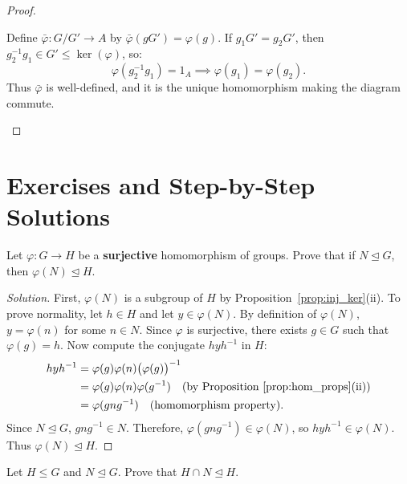 \begin{proof}
\begin{enumerate}[label=\textbf{(\roman*)}, leftmargin=*, itemsep=8pt]
    Define $\bar{\varphi}: G/G' \to A$ by $\bar{\varphi}(gG') = \varphi(g)$.
    If $g_1 G' = g_2 G'$, then $g_2^{-1}g_1 \in G' \le \ker(\varphi)$, so:
    \begin{equation*}
    \varphi(g_2^{-1}g_1) = 1_A \implies \varphi(g_1) = \varphi(g_2).
    \end{equation*}
    Thus $\bar{\varphi}$ is well-defined, and it is the unique homomorphism making the diagram commute.
\end{enumerate}
\end{proof}

\section{Exercises and Step-by-Step Solutions}
\label{sec:unit2_exercises}

\begin{problem}
Let $\varphi: G \to H$ be a \textbf{surjective} homomorphism of groups. Prove that if $N \trianglelefteq G$, then $\varphi(N) \trianglelefteq H$.
\end{problem}

\begin{proof}[Solution]
First, $\varphi(N)$ is a subgroup of $H$ by Proposition~\ref{prop:inj_ker}(ii).
To prove normality, let $h \in H$ and let $y \in \varphi(N)$.
By definition of $\varphi(N)$, $y = \varphi(n)$ for some $n \in N$.
Since $\varphi$ is surjective, there exists $g \in G$ such that $\varphi(g) = h$.
Now compute the conjugate $h y h^{-1}$ in $H$:
\begin{align*}
h y h^{-1} &= \varphi(g)\varphi(n)\bigl(\varphi(g)\bigr)^{-1} \\
&= \varphi(g)\varphi(n)\varphi(g^{-1}) \quad \text{(by Proposition~\ref{prop:hom_props}(ii))} \\
&= \varphi(gng^{-1}) \quad \text{(homomorphism property)}.
\end{align*}
Since $N \trianglelefteq G$, $gng^{-1} \in N$.
Therefore, $\varphi(gng^{-1}) \in \varphi(N)$, so $h y h^{-1} \in \varphi(N)$.
Thus $\varphi(N) \trianglelefteq H$.
\end{proof}

\begin{problem}
Let $H \le G$ and $N \trianglelefteq G$. Prove that $H \cap N \trianglelefteq H$.
\end{problem}

